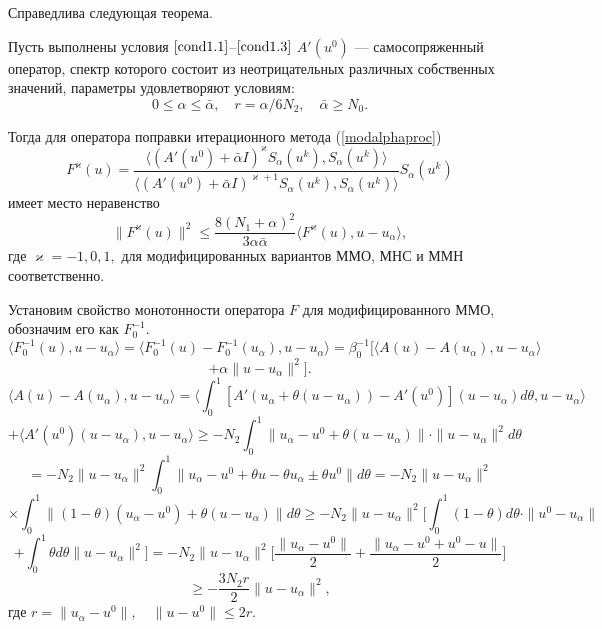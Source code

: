 Справедлива следующая теорема.
\begin{theorem}\label{teomodalpnomonot}
	Пусть выполнены условия $\eqref{cond1.1}$--$\eqref{cond1.3}$
	$A'(u^0)$ --- самосопряженный оператор, спектр которого состоит из неотрицательных различных собственных значений, параметры удовлетворяют условиям:
	\begin{equation}\label{cond2.4}
	0\le\alpha\le\bar{\alpha}, \quad r=\alpha/6N_2, \quad \bar{\alpha}\ge N_0.
	\end{equation}
	
	Тогда для оператора поправки итерационного метода (\ref{modalphaproc})
	$$F^\varkappa(u)=\frac{\langle (A'(u^0)+\bar\alpha I)^{\varkappa}S_\alpha(u^k), S_\alpha(u^k)\rangle}{\langle (A'(u^0)+\bar\alpha I)^{\varkappa+1}S_\alpha(u^k), S_\alpha(u^k)\rangle}S_\alpha(u^k)$$ имеет место неравенство
	$$\|F^\varkappa(u)\|^2\le\frac{8(N_1+\alpha)^2}{3\alpha\bar{\alpha}}\langle F^\varkappa(u), u-u_\alpha\rangle,$$
	где $\varkappa=-1, 0, 1,$ для модифицированных вариантов ММО, МНС и ММН соответственно.
\end{theorem} 
\proof Установим свойство монотонности оператора $F$ для модифицированного ММО, обозначим его как $F_0^{-1}$.
$$\langle F_0^{-1}(u),u-u_\alpha\rangle=\langle F_0^{-1}(u)-F_0^{-1}(u_\alpha),u-u_\alpha\rangle=\beta_0^{-1}[\langle A(u)-A(u_\alpha),u-u_\alpha\rangle$$ $$+\alpha\|u-u_\alpha\|^2].$$
$$\langle A(u)-A(u_\alpha),u-u_\alpha\rangle=\langle\int_{0}^{1}[A'(u_\alpha+\theta(u-u_\alpha))-A'(u^0)](u-u_\alpha)d\theta, u-u_\alpha\rangle$$ $$+\langle A'(u^0)(u-u_\alpha), u-u_\alpha\rangle\ge-N_2\int_{0}^{1}\|u_\alpha-u^0+\theta(u-u_\alpha)\|\cdot\|u-u_\alpha\|^2d\theta$$ $$=-N_2\|u-u_\alpha\|^2\int_{0}^{1}\|u_\alpha-u^0+\theta u-\theta u_\alpha\pm\theta u^0\|d\theta=-N_2\|u-u_\alpha\|^2$$
$$\times\int_{0}^{1}\|(1-\theta)(u_\alpha-u^0)+\theta(u-u_\alpha)\|d\theta\ge-N_2\|u-u_\alpha\|^2\Big[\int_{0}^{1}(1-\theta)d\theta\cdot\|u^0-u_\alpha\|$$$$+\int_{0}^{1}\theta d\theta\|u-u_\alpha\|^2\Big]=-N_2\|u-u_\alpha\|^2\Big[\frac{\|u_\alpha-u^0\|}{2}+\frac{\|u_\alpha-u^0+u^0-u\|}{2}\Big]$$
\begin{equation}\label{estmodif2.5}
\ge-\frac{3N_2r}{2}\|u-u_\alpha\|^2,
\end{equation}
где $r=\|u_\alpha-u^0\|,\quad \|u-u^0\|\le 2r$.

